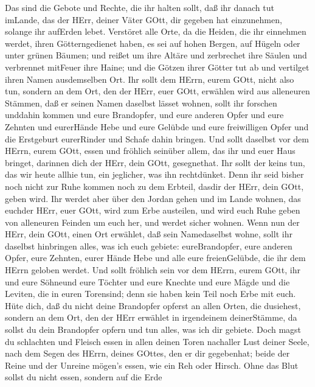  Das sind die Gebote und Rechte, die ihr halten sollt, daß
ihr danach tut imLande, das der HErr, deiner Väter GOtt, dir gegeben hat
einzunehmen, solange ihr aufErden lebet.  Verstöret alle
Orte, da die Heiden, die ihr einnehmen werdet, ihren Götterngedienet
haben, es sei auf hohen Bergen, auf Hügeln oder unter grünen Bäumen;
 und reißet um ihre Altäre und zerbrechet ihre Säulen und
verbrennet mitFeuer ihre Haine; und die Götzen ihrer Götter tut ab und
vertilget ihren Namen ausdemselben Ort.  Ihr sollt dem
HErrn, eurem GOtt, nicht also tun,  sondern an dem Ort, den
der HErr, euer GOtt, erwählen wird aus alleneuren Stämmen, daß er seinen
Namen daselbst lässet wohnen, sollt ihr forschen unddahin kommen
 und eure Brandopfer, und eure anderen Opfer und eure
Zehnten und eurerHände Hebe und eure Gelübde und eure freiwilligen Opfer
und die Erstgeburt eurerRinder und Schafe dahin bringen. 
Und sollt daselbst vor dem HErrn, eurem GOtt, essen und fröhlich
seinüber allem, das ihr und euer Haus bringet, darinnen dich der HErr,
dein GOtt, gesegnethat.  Ihr sollt der keins tun, das wir
heute allhie tun, ein jeglicher, was ihn rechtdünket.  Denn
ihr seid bisher noch nicht zur Ruhe kommen noch zu dem Erbteil, dasdir
der HErr, dein GOtt, geben wird.  Ihr werdet aber über den
Jordan gehen und im Lande wohnen, das euchder HErr, euer GOtt, wird zum
Erbe austeilen, und wird euch Ruhe geben von alleneuren Feinden um euch
her, und werdet sicher wohnen.  Wenn nun der HErr, dein
GOtt, einen Ort erwählet, daß sein Namedaselbst wohne, sollt ihr
daselbst hinbringen alles, was ich euch gebiete: eureBrandopfer, eure
anderen Opfer, eure Zehnten, eurer Hände Hebe und alle eure
freienGelübde, die ihr dem HErrn geloben werdet.  Und sollt
fröhlich sein vor dem HErrn, eurem GOtt, ihr und eure Söhneund eure
Töchter und eure Knechte und eure Mägde und die Leviten, die in euren
Torensind; denn sie haben kein Teil noch Erbe mit euch. 
Hüte dich, daß du nicht deine Brandopfer opferst an allen Orten, die
dusiehest,  sondern an dem Ort, den der HErr erwählet in
irgendeinem deinerStämme, da sollst du dein Brandopfer opfern und tun
alles, was ich dir gebiete.  Doch magst du schlachten und
Fleisch essen in allen deinen Toren nachaller Lust deiner Seele, nach
dem Segen des HErrn, deines GOttes, den er dir gegebenhat; beide der
Reine und der Unreine mögen's essen, wie ein Reh oder Hirsch.
 Ohne das Blut sollst du nicht essen, sondern auf die Erde
